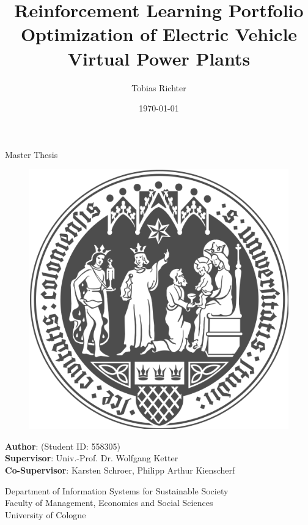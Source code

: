 \documentclass[a4paper, twoside, 12pt]{article}
\author{Tobias Richter}
\date{\today}
\title{Reinforcement Learning Portfolio Optimization of Electric Vehicle Virtual Power Plants}
\newcommand{\studentID}{558305}
\newcommand{\thesistype}{Master Thesis}
\newcommand{\supervisor}{Univ.-Prof. Dr. Wolfgang Ketter}
\newcommand{\cosupervisor}{Karsten Schroer, Philipp Arthur Kienscherf}
\begin{document}
\makeatletter
\begin{titlepage}
    \begin{center}
        \vspace*{1cm}

        \Large
        \textbf{\@title{}}

        \vspace{1.5cm}

        \thesistype{}

        \vspace{1cm}

        \begin{figure}[htbp]
             \centering
             \includegraphics[width=.5\linewidth]{./fig/UoC_Logo.png}
        \end{figure}

        \vspace{1cm}

        \large
        \textbf{Author}: \@author{} (Student ID: \studentID{})\\
        \large
        \textbf{Supervisor}: \supervisor{}\\
        \large
        \textbf{Co-Supervisor}: \cosupervisor{}

        \vspace{1cm}
        \large
        Department of Information Systems for Sustainable Society\\
        Faculty of Management, Economics and Social Sciences\\
        University of Cologne\\

        \vspace{1cm}
        \@date{}

    \end{center}
\end{titlepage}
\makeatother
\clearpage
\end{document}
